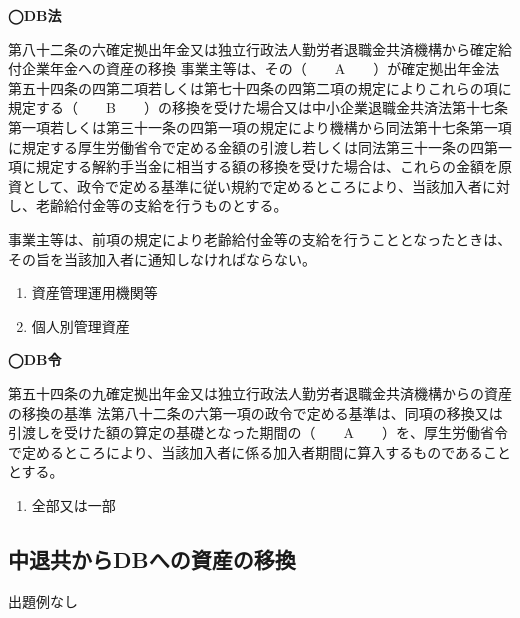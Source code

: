 \begin{fillblank}[年金1 2020 問題1(2)C,E]
  \noindent \textbf{◯DB法}
  \begin{lawstructure}
    \begin{lawarticle}{第八十二条の六}{確定拠出年金又は独立行政法人勤労者退職金共済機構から確定給付企業年金への資産の移換}
      事業主等は、その（　　A　　）が確定拠出年金法第五十四条の四第二項若しくは第七十四条の四第二項の規定によりこれらの項に規定する（　　B　　）の移換を受けた場合又は中小企業退職金共済法第十七条第一項若しくは第三十一条の四第一項の規定により機構から同法第十七条第一項に規定する厚生労働省令で定める金額の引渡し若しくは同法第三十一条の四第一項に規定する解約手当金に相当する額の移換を受けた場合は、これらの金額を原資として、政令で定める基準に従い規約で定めるところにより、当該加入者に対し、老齢給付金等の支給を行うものとする。

      事業主等は、前項の規定により老齢給付金等の支給を行うこととなったときは、その旨を当該加入者に通知しなければならない。
    \end{lawarticle}
  \end{lawstructure}
\end{fillblank}


\begin{answerbox}
  \begin{enumerate}[A: ]
    \item 資産管理運用機関等
    \item 個人別管理資産
  \end{enumerate}
\end{answerbox}



\begin{fillblank}[年金2 2018 問題1(3)D]
  \noindent \textbf{◯DB令}
  \begin{lawstructure}
    \begin{lawarticle}{第五十四条の九}{確定拠出年金又は独立行政法人勤労者退職金共済機構からの資産の移換の基準}
      法第八十二条の六第一項の政令で定める基準は、同項の移換又は引渡しを受けた額の算定の基礎となった期間の（　　A　　）を、厚生労働省令で定めるところにより、当該加入者に係る加入者期間に算入するものであることとする。
     \end{lawarticle}
  \end{lawstructure}
\end{fillblank}


\begin{answerbox}
  \begin{enumerate}[A: ]
    \item 全部又は一部
  \end{enumerate}
\end{answerbox}

\newpage

\subsection{中退共からDBへの資産の移換}

出題例なし

\newpage


